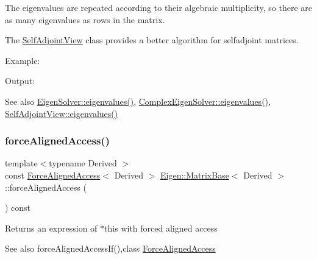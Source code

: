 The eigenvalues are repeated according to their algebraic multiplicity, so there are as many eigenvalues as rows in the matrix.

The \mbox{\hyperlink{class_eigen_1_1_self_adjoint_view}{Self\+Adjoint\+View}} class provides a better algorithm for selfadjoint matrices.

Example\+: 
\begin{DoxyCodeInclude}{0}
\end{DoxyCodeInclude}
 Output\+: 
\begin{DoxyVerbInclude}
\end{DoxyVerbInclude}


\begin{DoxySeeAlso}{See also}
\mbox{\hyperlink{class_eigen_1_1_eigen_solver_a114189009e42f5e03372a7a3dfa33b97}{Eigen\+Solver\+::eigenvalues()}}, \mbox{\hyperlink{class_eigen_1_1_complex_eigen_solver_a10c25c7620e7faedcd39991cce3a757b}{Complex\+Eigen\+Solver\+::eigenvalues()}}, \mbox{\hyperlink{class_eigen_1_1_self_adjoint_view_ad4f34424b4ea12de9bbc5623cb938b4f}{Self\+Adjoint\+View\+::eigenvalues()}} 
\end{DoxySeeAlso}
\mbox{\label{class_eigen_1_1_matrix_base_ad2fdb842d9a715f8778d0b33c29cfe49}} 
\subsubsection{\texorpdfstring{forceAlignedAccess()}{forceAlignedAccess()}\hspace{0.1cm}{\footnotesize\ttfamily [1/2]}}
{\footnotesize\ttfamily template$<$typename Derived $>$ \\
const \mbox{\hyperlink{class_eigen_1_1_force_aligned_access}{Force\+Aligned\+Access}}$<$ Derived $>$ \mbox{\hyperlink{class_eigen_1_1_matrix_base}{Eigen\+::\+Matrix\+Base}}$<$ Derived $>$\+::force\+Aligned\+Access (\begin{DoxyParamCaption}{ }\end{DoxyParamCaption}) const\hspace{0.3cm}{\ttfamily [inline]}}

\begin{DoxyReturn}{Returns}
an expression of $\ast$this with forced aligned access 
\end{DoxyReturn}
\begin{DoxySeeAlso}{See also}
force\+Aligned\+Access\+If(),class \mbox{\hyperlink{class_eigen_1_1_force_aligned_access}{Force\+Aligned\+Access}} 
\end{DoxySeeAlso}
\mbox{\label{class_eigen_1_1_matrix_base_afdaf810ac1708ca6d6ecdcfac1e06699}} 
